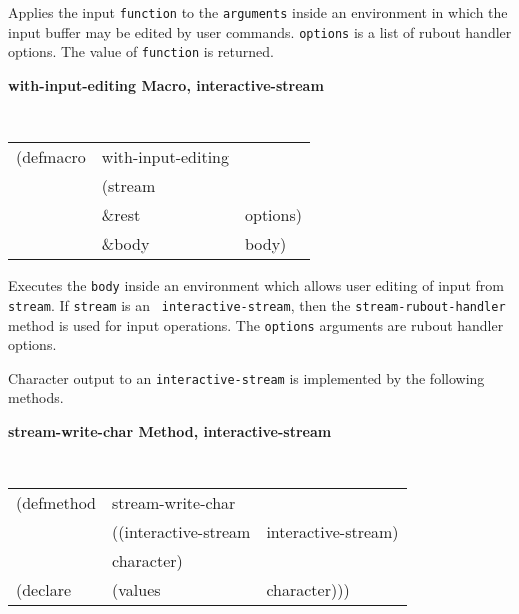 \documentclass[twoside]{book}
\begin{document}
\begin{sloppy}
{\begin{flushright}
{}\end{flushright}}

\begin{flushright} \parbox[t]{6.125in}{
Applies the input {\tt function} to the {\tt arguments} inside an environment in
which the input buffer may be edited by user commands. {\tt options} is a list of rubout
handler options. The value of {\tt function} is returned.
 
}
\end{flushright}

{\samepage
{\large {\bf with-input-editing \hfill Macro, interactive-stream}}
\begin{flushright} \parbox[t]{6.125in}{
\tt
\begin{tabular}{lll}
\raggedright
(defmacro & with-input-editing & \\
& (stream \\
& \&rest & options)\\
& \&body  & body)
\end{tabular}
\rm

}\end{flushright}}

\begin{flushright} \parbox[t]{6.125in}{
Executes the {\tt body} inside an environment which allows user editing
of input from {\tt stream}. If {\tt stream} is an {\tt
interactive-stream}, then the {\tt stream-rubout-handler}
method is used for input operations. The {\tt options} arguments are rubout
handler options. 
 
}
\end{flushright}


Character output to an {\tt interactive-stream} is implemented by the following
methods.

{\samepage
{\large {\bf stream-write-char \hfill Method, interactive-stream}}
\begin{flushright} \parbox[t]{6.125in}{
\tt
\begin{tabular}{lll}
\raggedright
(defmethod & stream-write-char & \\
& ((interactive-stream  &interactive-stream)\\
& character)\\
(declare &(values &character)))
\end{tabular}
\rm

}
\end{flushright}}
\end{sloppy}
\end{document}
